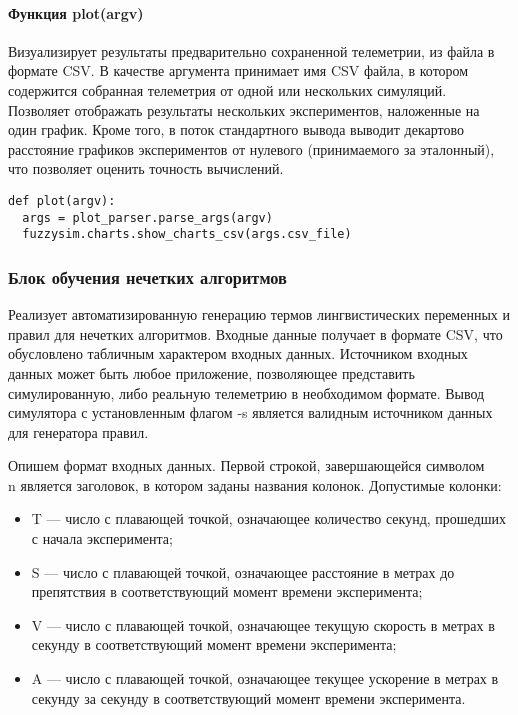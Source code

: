 \paragraph{ Функция plot(argv)}

Визуализирует результаты предварительно сохраненной телеметрии, из файла в формате CSV. В качестве аргумента принимает имя CSV файла, в котором содержится собранная телеметрия от одной или нескольких симуляций. Позволяет отображать результаты нескольких экспериментов, наложенные на один график. Кроме того, в поток стандартного вывода выводит декартово расстояние графиков экспериментов от нулевого (принимаемого за эталонный), что позволяет оценить точность вычислений.

\begin{lstlisting}[style=pythonstyle,caption={  }, label=lst:func:1]
def plot(argv):
  args = plot_parser.parse_args(argv)
  fuzzysim.charts.show_charts_csv(args.csv_file)
\end{lstlisting}


\subsubsection{Блок обучения нечетких алгоритмов }

Реализует автоматизированную генерацию термов лингвистических переменных и правил для нечетких алгоритмов. Входные данные получает в формате CSV, что обусловлено табличным характером входных данных. Источником входных данных может быть любое приложение, позволяющее представить симулированную, либо реальную телеметрию в необходимом формате. Вывод симулятора с установленным флагом -s является валидным источником данных для генератора правил.

Опишем формат входных данных. Первой строкой, завершающейся символом \\n является заголовок, в котором заданы названия колонок. Допустимые колонки:

\begin{itemize}
\item T — число с плавающей точкой, означающее количество секунд, прошедших с начала эксперимента;
\item S — число с плавающей точкой, означающее расстояние в метрах до препятствия в соответствующий момент времени эксперимента;
\item V — число с плавающей точкой, означающее текущую скорость в метрах в секунду в соответствующий момент времени эксперимента;
\item A — число с плавающей точкой, означающее текущее ускорение в метрах в секунду за секунду в соответствующий момент времени эксперимента.
\end{itemize}

